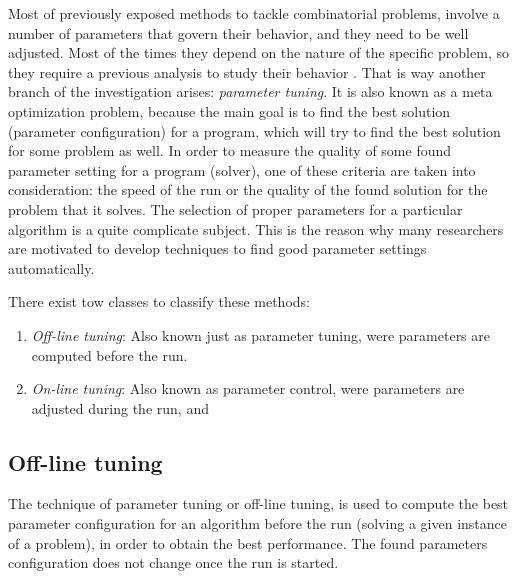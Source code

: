 Most of previously exposed methods to tackle combinatorial problems, involve a number of parameters that govern their behavior, and they need to be well adjusted. Most of the times they depend on the nature of the specific problem, so they require a previous analysis to study their behavior \cite{Birattari2005}. That is way another branch of the investigation arises: {\it parameter tuning}. It is also known as a meta optimization problem, because the main goal is to find the best solution (parameter configuration) for a program, which will try to find the best solution for some problem as well. In order to measure the quality of some found parameter setting for a program (solver), one of these criteria are taken into consideration: the speed of the run or the quality of the found solution for the problem that it solves. The selection of proper parameters for a particular algorithm is a quite complicate subject. This is the reason why many researchers are motivated to develop techniques to find good parameter settings automatically.

There exist tow classes to classify these methods: 
\begin{enumerate}
\item \textit{Off-line tuning}: Also known just as parameter tuning, were parameters are computed before the run.
\item \textit{On-line tuning}: Also known as parameter control, were parameters are adjusted during the run, and
\end{enumerate}

\subsection{Off-line tuning}

The technique of parameter tuning or off-line tuning, is used to compute the best parameter configuration for an algorithm before the run (solving a given instance of a problem), in order to obtain the best performance. The found parameters configuration does not change once the run is started. 

